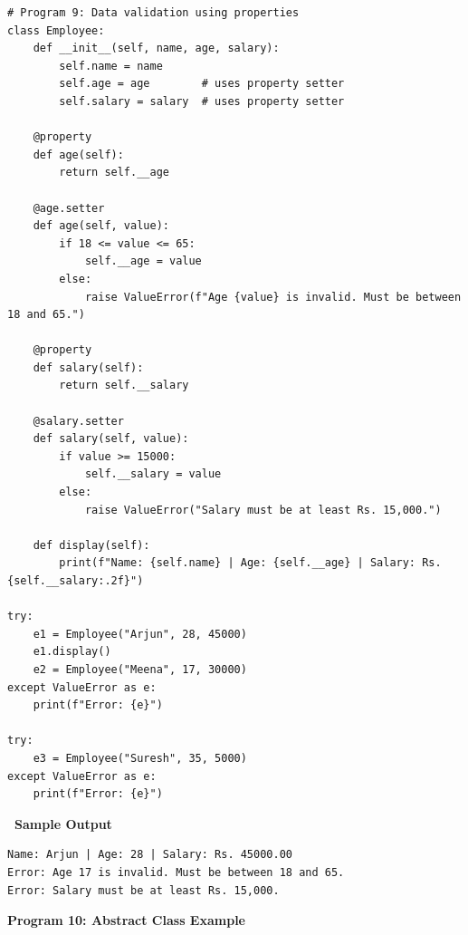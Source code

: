 \documentclass[12pt,a4paper]{article}
\newcommand{\outhead}{\noindent\colorbox{cmrgreen!25}%
  {\textbf{\small\color{cmrdark}~Sample Output~}}\par\vspace{-1pt}}
\begin{document}
\begin{lstlisting}
# Program 9: Data validation using properties
class Employee:
    def __init__(self, name, age, salary):
        self.name = name
        self.age = age        # uses property setter
        self.salary = salary  # uses property setter

    @property
    def age(self):
        return self.__age

    @age.setter
    def age(self, value):
        if 18 <= value <= 65:
            self.__age = value
        else:
            raise ValueError(f"Age {value} is invalid. Must be between 18 and 65.")

    @property
    def salary(self):
        return self.__salary

    @salary.setter
    def salary(self, value):
        if value >= 15000:
            self.__salary = value
        else:
            raise ValueError("Salary must be at least Rs. 15,000.")

    def display(self):
        print(f"Name: {self.name} | Age: {self.__age} | Salary: Rs. {self.__salary:.2f}")

try:
    e1 = Employee("Arjun", 28, 45000)
    e1.display()
    e2 = Employee("Meena", 17, 30000)
except ValueError as e:
    print(f"Error: {e}")

try:
    e3 = Employee("Suresh", 35, 5000)
except ValueError as e:
    print(f"Error: {e}")
\end{lstlisting}

\outhead
\begin{lstlisting}[style=outputstyle]
Name: Arjun | Age: 28 | Salary: Rs. 45000.00
Error: Age 17 is invalid. Must be between 18 and 65.
Error: Salary must be at least Rs. 15,000.
\end{lstlisting}

\vspace{0.5cm}

\textbf{Program 10: Abstract Class Example}
\end{document}
